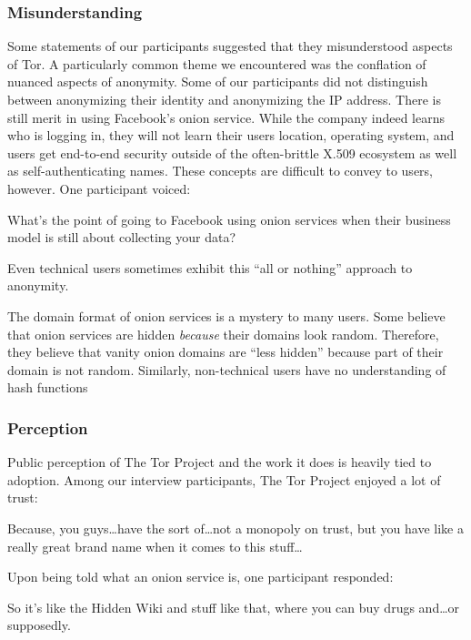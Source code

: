 \subsubsection{Misunderstanding}

Some statements of our participants suggested that they misunderstood aspects of
Tor.  A particularly common theme we encountered was the conflation of nuanced
aspects of anonymity.  Some of our participants did not distinguish between
anonymizing their identity and anonymizing the IP address.  There is still merit
in using Facebook's onion service.  While the company indeed learns who is
logging in, they will not learn their users location, operating system, and
users get end-to-end security outside of the often-brittle X.509 ecosystem as
well as self-authenticating names.  These concepts are difficult to convey to
users, however.  One participant voiced:

\begin{displayquote}
What's the point of going to Facebook using onion services when their business
model is still about collecting your data?
\end{displayquote}

Even technical users sometimes exhibit this ``all or nothing'' approach to
anonymity.

The domain format of onion services is a mystery to many users.  Some believe
that onion services are hidden \emph{because} their domains look random.
Therefore, they believe that vanity onion domains are ``less hidden'' because
part of their domain is not random.  Similarly, non-technical users have no
understanding of hash functions 

\subsubsection{Perception}

Public perception of The Tor Project and the work it does is heavily tied to
adoption.  Among our interview participants, The Tor Project enjoyed a lot
of trust:

\begin{displayquote}
Because, you guys\dots have the sort of\dots not a monopoly on trust, but you
have like a really great brand name when it comes to this stuff\dots
\end{displayquote}

Upon being told what an onion service is, one participant responded:

\begin{displayquote}
So it's like the Hidden Wiki and stuff like that, where you can buy drugs
and\dots or supposedly.
\end{displayquote}

